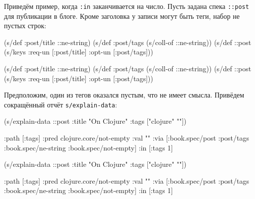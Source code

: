 Приведём пример, когда \verb|:in| заканчивается на число. Пусть задана
спека \verb|::post| для публикации в блоге. Кроме заголовка у записи могут
быть теги, набор не пустых строк:

\ifx\DEVICETYPE\MOBILE

\begin{english}
  \begin{clojure}
(s/def :post/title ::ne-string)
(s/def :post/tags
  (s/coll-of ::ne-string))
(s/def ::post
  (s/keys :req-un [:post/title]
          :opt-un [:post/tags]))
  \end{clojure}
\end{english}

\else

\begin{english}
  \begin{clojure}
(s/def :post/title ::ne-string)
(s/def :post/tags (s/coll-of ::ne-string))
(s/def ::post (s/keys :req-un [:post/title]
                      :opt-un [:post/tags]))
  \end{clojure}
\end{english}

\fi

Предположим, один из тегов оказался пустым, что не имеет смысла. Привёдем
сокращённый отчёт \verb|s/explain-data|:

\ifx\DEVICETYPE\MOBILE

\begin{english}
  \begin{clojure}
(s/explain-data ::post
  {:title "On Clojure"
   :tags ["clojure" ""]})

{:path [:tags]
 :pred clojure.core/not-empty
 :val ""
 :via [:book.spec/post
       :post/tags
       :book.spec/ne-string
       :book.spec/not-empty]
 :in [:tags 1]}
  \end{clojure}
\end{english}

\else

\begin{english}
  \begin{clojure}
(s/explain-data ::post {:title "On Clojure"
                        :tags ["clojure" ""]})

{:path [:tags]
 :pred clojure.core/not-empty
 :val ""
 :via [:book.spec/post
       :post/tags
       :book.spec/ne-string
       :book.spec/not-empty]
 :in [:tags 1]}
  \end{clojure}
\end{english}

